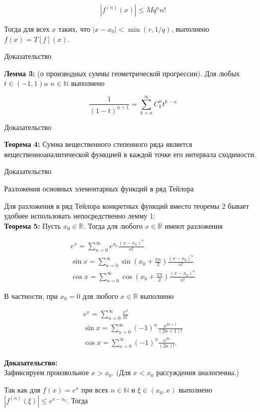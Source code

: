 \documentclass[a4paper,12pt]{article} %
\begin{document}
$$
\left|f^{(n)}(x)\right| \leq M q^{n} n !
$$

Тогда для всех $x$ таких, что $\left|x-x_{0}\right|<\min (r, 1 / q)$, выполнено $f(x)=T[f](x)$.

Доказательство

\textbf{Лемма 3:} (о производных суммы геометрической прогрессии). Для любых $t \in(-1,1) u$ $n \in \mathbb{N}$ выполнено

$$
\frac{1}{(1-t)^{n+1}}=\sum_{k=n}^{\infty} C_{k}^{n} t^{k-n}
$$

Доказательство

\textbf{Теорема 4:} Сумма вещественного степенного ряда является вещественноаналитической функцией в каждой точке его интервала сходимости.

Доказательство

Разложения основных элементарных функций в ряд Тейлора

Для разложения в ряд Тейлора конкретных функций вместо теоремы 2 бывает удобнее использовать непосредственно лемму 1:\\
\textbf{Теорема 5:} Пусть $x_{0} \in \mathbb{R}$. Тогда для любого $x \in \mathbb{R}$ имеют разложения

$$
\begin{gathered}
e^{x}=\sum_{n=0}^{\infty} e^{x_{0}} \frac{\left(x-x_{0}\right)^{n}}{n !} \\
\sin x=\sum_{n=0}^{\infty} \sin \left(x_{0}+\frac{\pi n}{2}\right) \frac{\left(x-x_{0}\right)^{n}}{n !} \\
\cos x=\sum_{n=0}^{\infty} \cos \left(x_{0}+\frac{\pi n}{2}\right) \frac{\left(x-x_{0}\right)^{n}}{n !}
\end{gathered}
$$

В частности, при $x_{0}=0$ для любого $x \in \mathbb{R}$ выполнено

$$
\begin{gathered}
e^{x}=\sum_{n=0}^{\infty} \frac{x^{n}}{n !} \\
\sin x=\sum_{n=0}^{\infty}(-1)^{n} \frac{x^{2 n+1}}{(2 n+1) !} \\
\cos x=\sum_{n=0}^{\infty}(-1)^{n} \frac{x^{2 n}}{(2 n) !} .
\end{gathered}
$$

\textbf{Доказательство:}\\
Зафиксируем произвольное $x>x_{0}$. (Для $x<x_{0}$ рассуждения аналогичны.)

Так как для $f(x)=e^{x}$ при всех $n \in \mathbb{N}$ и $\xi \in\left(x_{0}, x\right)$ выполнено $\left|f^{(n)}(\xi)\right| \leq e^{x-x_{0}}$. Тогда
\end{document}
